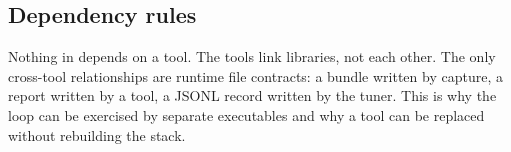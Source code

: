 \documentclass[11pt,twoside,a4paper]{article}
\newcommand{\fpath}[1]{\texttt{\detokenize{#1}}}
\begin{document}
\subsection{Dependency rules}
\label{sec:deps}

Nothing in \fpath{libs/} depends on a tool. The tools link libraries, not each
other. The only cross-tool relationships are runtime file contracts: a bundle
written by capture, a report written by a tool, a JSONL record written by the
tuner. This is why the loop can be exercised by separate executables and why a
tool can be replaced without rebuilding the stack.





\end{document}
